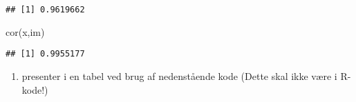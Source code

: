 \documentclass[
  12pt,
]{article}
\newenvironment{Shaded}{\begin{snugshade}}{\end{snugshade}}
\newcommand{\FunctionTok}[1]{\textcolor[rgb]{0.00,0.00,0.00}{#1}}
\newcommand{\NormalTok}[1]{#1}
\providecommand{\tightlist}{%
  \setlength{\itemsep}{0pt}\setlength{\parskip}{0pt}}
\begin{document}
\begin{verbatim}
## [1] 0.9619662
\end{verbatim}

\begin{Shaded}
\begin{Highlighting}[]
\FunctionTok{cor}\NormalTok{(x,im)}
\end{Highlighting}
\end{Shaded}

\begin{verbatim}
## [1] 0.9955177
\end{verbatim}

\begin{enumerate}
\def\labelenumi{\arabic{enumi}.}
\setcounter{enumi}{1}
\tightlist
\item
  presenter i en tabel ved brug af nedenstående kode (Dette skal ikke
  være i R-kode!)
\end{enumerate}

  
\end{document}
